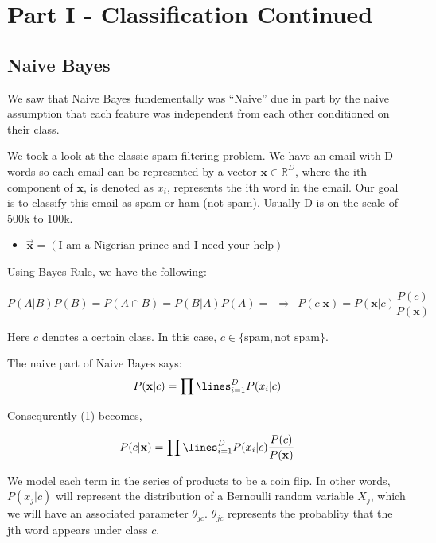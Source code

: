 
\section{Part I - Classification Continued}
\subsection{Naive Bayes}

We saw that Naive Bayes fundementally was ``Naive'' due in part by the naive assumption that each feature was independent from each other conditioned on their class.  

We took a look at the classic spam filtering problem.  We have an email with D words so each email can be represented by a vector $\mathbf{x} \in \mathbb{R}^D$, where the ith component of $\mathbf{x}$, is denoted as $x_i$, represents the ith word in the email.  Our goal is to classify this email as spam or ham (not spam).  Usually D is on the scale of 500k to 100k.  

\begin{itemize}
\item 
 $\vec{\mathbf{x}} = ( \text{I am a Nigerian prince and I need your help} ) $
\end{itemize}

Using Bayes Rule, we have the following: 

\begin{equation}
P(A | B ) P(B) = P(A \cap B) = P(B | A ) P(A) = ~~ \Rightarrow ~~ P(c | \mathbf{x}) = P(\mathbf{x} | c ) \frac{P(c)}{P(\mathbf{x})}
\end{equation}

Here $c$ denotes a certain class.  In this case, $c \in \{ \text{spam}, \text{not spam} \}$.   

\indent 

The naive part of Naive Bayes says: 
$$
P(\mathbf{x} | c ) = \prod\lines_{i=1}^D P(x_i | c) 
$$

Consequrently (1) becomes, 

\begin{equation}
P(c | \mathbf{x}) = \prod\lines_{i=1}^D P(x_i | c)  \frac{P(c)}{P(\mathbf{x})}
\end{equation}

We model each term in the series of products to be a coin flip.  In other words, $P(x_j | c)$ will represent the distribution of a Bernoulli random variable $X_j$, which we will have an associated parameter $\theta_{jc}$. $\theta_{jc}$ represents the probablity that the jth word appears under class $c$. 

